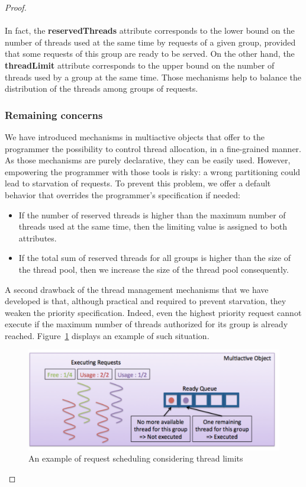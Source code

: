\documentclass[11pt]{report}
\begin{document}
\begin{proof}
\paragraph{}
In fact, the \textbf{reservedThreads} attribute corresponds to the lower bound on the number of threads used at the same time by requests of a given group, provided that some requests of this group are ready to be served. On the other hand, the \textbf{threadLimit} attribute corresponds to the upper bound on the number of threads used by a group at the same time. Those mechanisms help to balance the distribution of the threads among groups of requests.

\subsubsection{Remaining concerns}
We have introduced mechanisms in multiactive objects that offer to the programmer the possibility to control thread allocation, in a fine-grained manner. As those mechanisms are purely declarative, they can be easily used. However, empowering the programmer with those tools is risky: a wrong partitioning could lead to starvation of requests. To prevent this problem, we offer a default behavior that overrides the programmer's specification if needed:
\begin{itemize}
\item If the number of reserved threads is higher than the maximum number of threads used at the same time, then the limiting value is assigned to both attributes.
\item If the total sum of reserved threads for all groups is higher than the size of the thread pool, then we increase the size of the thread pool consequently.
\end{itemize}
A second drawback of the thread management mechanisms that we have developed is that, although practical and required to prevent starvation, they weaken the priority specification. Indeed, even the highest priority request cannot execute if the maximum number of threads authorized for its group is already reached. Figure~\ref{fig:thread_limit} displays an example of such situation.

\begin{figure}[!ht]
      \begin{minipage}[c]{\textwidth}
      \centering
      \includegraphics[scale=0.5]{pictures/thread_limit.pdf}
      \end{minipage}
      \caption{An example of request scheduling considering thread limits}
      \label{fig:thread_limit} 
\end{figure}


\end{proof}
\end{document}
